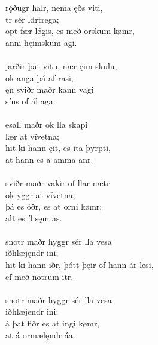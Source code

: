 \bva {}rǫ́ðugr halr, \hld nema ęðs viti, \\%
\ind {}tr sér ldrtrega; \\%
opt fær lǿgis, \hld es með orskum kømr, \\%
\ind {}anni hęimskum agi.\\%

 \\

\bva {}jarðir þat vitu, \hld nær ęim skulu, \\%
\ind ok anga þá af rasi; \\%
ęn sviðr maðr \hld kann vagi \\%
\ind síns of ál aga.\\%

 \\

\bva {}esall maðr \hld ok lla skapi \\%
\ind {}lær at vívetna; \\%
hit-ki hann ęit, \hld es ita þyrpti, \\%
\ind at hann es-a amma anr.\\%

 \\

\bva {}sviðr maðr \hld vakir of llar nætr \\%
\ind ok yggr at vívetna; \\%
þá es óðr, \hld es at orni kømr; \\%
\ind alt es íl sęm as.\\%

 \\

\bva {}snotr maðr \hld hyggr sér lla vesa \\%
\ind {}iðhlæjęndr ini; \\%
hit-ki hann iðr, \hld þótt þęir of hann ár lesi, \\%
\ind ef með notrum itr.\\%

 \\

\bva {}snotr maðr \hld hyggr sér lla vesa \\%
\ind {}iðhlæjendr ini; \\%
á þat fiðr \hld es at ingi kømr, \\%
\ind at á ormælęndr áa.\\%

